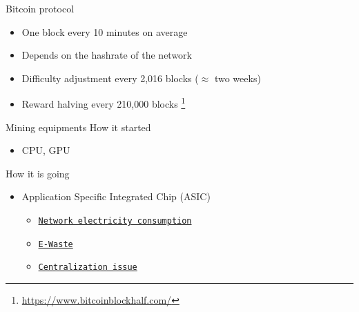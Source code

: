 \documentclass{beamer}
\newcommand\blfootnote[1]{%
  \begingroup
  \renewcommand\thefootnote{}\footnote{#1}%
  \addtocounter{footnote}{-1}%
  \endgroup
}
\begin{document}
\begin{frame}{Bitcoin protocol}
\begin{itemize}
  \item One block every 10 minutes on average
  \item Depends on the hashrate of the network
  \item Difficulty adjustment every 2,016 blocks ($\approx$ two weeks)
  \item Reward halving every 210,000 blocks\blfootnote{\url{https://www.bitcoinblockhalf.com/}}
\end{itemize}

\end{frame}
\begin{frame}{Mining equipments}
How it started
\begin{itemize}
  \item CPU, GPU
\end{itemize}
How it is going
\begin{itemize}
  \item Application Specific Integrated Chip (ASIC)
  \begin{itemize}
  \item  \href{https://digiconomist.net/bitcoin-energy-consumption}{\texttt{Network electricity consumption}}
  \item  \href{https://www.bitmain.com/}{\texttt{E-Waste}}
  \item \href{https://mempool.space/graphs/mining/pools}{\texttt{Centralization issue}}
  \end{itemize}
\end{itemize}
\end{frame}
\end{document}
